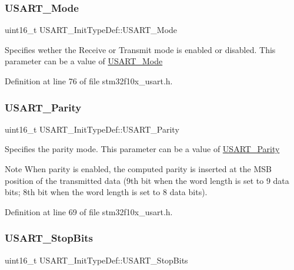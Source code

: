 \subsubsection{\texorpdfstring{U\+S\+A\+R\+T\+\_\+\+Mode}{USART\_Mode}}
{\footnotesize\ttfamily uint16\+\_\+t U\+S\+A\+R\+T\+\_\+\+Init\+Type\+Def\+::\+U\+S\+A\+R\+T\+\_\+\+Mode}

Specifies wether the Receive or Transmit mode is enabled or disabled. This parameter can be a value of \hyperlink{group___u_s_a_r_t___mode}{U\+S\+A\+R\+T\+\_\+\+Mode} 

Definition at line 76 of file stm32f10x\+\_\+usart.\+h.

\mbox{\label{struct_u_s_a_r_t___init_type_def_a5ae66aba755bac37c5cf0dfbf529e2ed}} 
\subsubsection{\texorpdfstring{U\+S\+A\+R\+T\+\_\+\+Parity}{USART\_Parity}}
{\footnotesize\ttfamily uint16\+\_\+t U\+S\+A\+R\+T\+\_\+\+Init\+Type\+Def\+::\+U\+S\+A\+R\+T\+\_\+\+Parity}

Specifies the parity mode. This parameter can be a value of \hyperlink{group___u_s_a_r_t___parity}{U\+S\+A\+R\+T\+\_\+\+Parity} \begin{DoxyNote}{Note}
When parity is enabled, the computed parity is inserted at the M\+SB position of the transmitted data (9th bit when the word length is set to 9 data bits; 8th bit when the word length is set to 8 data bits). 
\end{DoxyNote}


Definition at line 69 of file stm32f10x\+\_\+usart.\+h.

\mbox{\label{struct_u_s_a_r_t___init_type_def_ac745bceb79a6c4c2640fd8e8ce6639d6}} 
\subsubsection{\texorpdfstring{U\+S\+A\+R\+T\+\_\+\+Stop\+Bits}{USART\_StopBits}}
{\footnotesize\ttfamily uint16\+\_\+t U\+S\+A\+R\+T\+\_\+\+Init\+Type\+Def\+::\+U\+S\+A\+R\+T\+\_\+\+Stop\+Bits}

